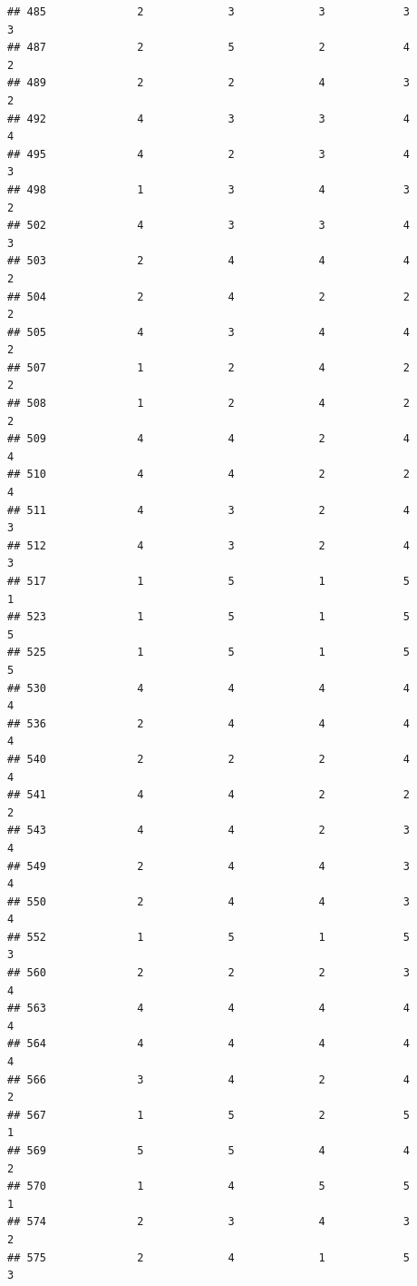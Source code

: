 \documentclass[
]{article}
\begin{document}
\begin{verbatim}
## 485              2             3             3            3          3
## 487              2             5             2            4          2
## 489              2             2             4            3          2
## 492              4             3             3            4          4
## 495              4             2             3            4          3
## 498              1             3             4            3          2
## 502              4             3             3            4          3
## 503              2             4             4            4          2
## 504              2             4             2            2          2
## 505              4             3             4            4          2
## 507              1             2             4            2          2
## 508              1             2             4            2          2
## 509              4             4             2            4          4
## 510              4             4             2            2          4
## 511              4             3             2            4          3
## 512              4             3             2            4          3
## 517              1             5             1            5          1
## 523              1             5             1            5          5
## 525              1             5             1            5          5
## 530              4             4             4            4          4
## 536              2             4             4            4          4
## 540              2             2             2            4          4
## 541              4             4             2            2          2
## 543              4             4             2            3          4
## 549              2             4             4            3          4
## 550              2             4             4            3          4
## 552              1             5             1            5          3
## 560              2             2             2            3          4
## 563              4             4             4            4          4
## 564              4             4             4            4          4
## 566              3             4             2            4          2
## 567              1             5             2            5          1
## 569              5             5             4            4          2
## 570              1             4             5            5          1
## 574              2             3             4            3          2
## 575              2             4             1            5          3

\end{verbatim}
\end{document}
